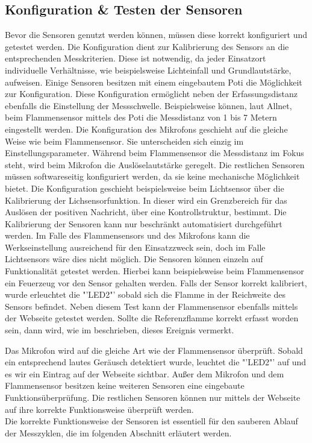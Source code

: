 \subsection{Konfiguration \& Testen der Sensoren}
	Bevor die Sensoren genutzt werden können, müssen diese korrekt konfiguriert und getestet werden. Die Konfiguration dient zur Kalibrierung des Sensors an die entsprechenden Messkriterien. Diese ist notwendig, da jeder Einsatzort individuelle Verhältnisse, wie beispielsweise Lichteinfall und Grundlautstärke, aufweisen. Einige Sensoren besitzen mit einem eingebautem \ac{Poti} die Möglichkeit zur Konfiguration. Diese Konfiguration ermöglicht neben der Erfassungsdistanz ebenfalls die Einstellung der Messschwelle. Beispielsweise können, laut Allnet\cite{111861pd90:online}, beim Flammensensor mittels des \ac{Poti} die Messdistanz von 1 bis 7 Metern eingestellt werden. Die Konfiguration des Mikrofons geschieht auf die gleiche Weise wie beim Flammensensor. Sie unterscheiden sich einzig im Einstellungsparameter. Während beim Flammensensor die Messdistanz im Fokus steht, wird beim Mikrofon die Auslöselautstärke geregelt. Die restlichen Sensoren müssen softwareseitig konfiguriert werden, da sie keine mechanische Möglichkeit bietet. Die Konfiguration geschieht beispielsweise beim Lichtsensor über die Kalibrierung der Lichsensorfunktion. In dieser wird ein Grenzbereich für das Auslösen der positiven Nachricht, über eine Kontrollstruktur, bestimmt. Die Kalibrierung der Sensoren kann nur beschränkt automatisiert durchgeführt werden. Im Falle des Flammensensors und des Mikrofons kann die Werkseinstellung ausreichend für den Einsatzzweck sein, doch im Falle Lichtsensors wäre dies nicht möglich. Die Sensoren können einzeln auf Funktionalität getestet werden. Hierbei kann beispielsweise beim Flammensensor ein Feuerzeug vor den Sensor gehalten werden. Falls der Sensor korrekt kalibriert, wurde erleuchtet die "'LED2"' sobald sich die Flamme in der Reichweite des Sensors befindet. Neben diesem Test kann der Flammensensor ebenfalls mittels der Webseite getestet werden. Sollte die Referenzflamme korrekt erfasst worden sein, dann wird, wie im  beschrieben, dieses Ereignis vermerkt.
	
	Das Mikrofon wird auf die gleiche Art wie der Flammensensor überprüft. Sobald ein entsprechend lautes Geräusch detektiert wurde, leuchtet die "'LED2"' auf und es wir ein Eintrag auf der Webseite sichtbar. Außer dem Mikrofon und dem Flammensensor besitzen keine weiteren Sensoren eine eingebaute Funktionsüberprüfung. Die restlichen Sensoren können nur mittels der Webseite auf ihre korrekte Funktionsweise überprüft werden.\\
	Die korrekte Funktionsweise der Sensoren ist essentiell für den sauberen Ablauf der Messzyklen, die im folgenden Abschnitt erläutert werden.

